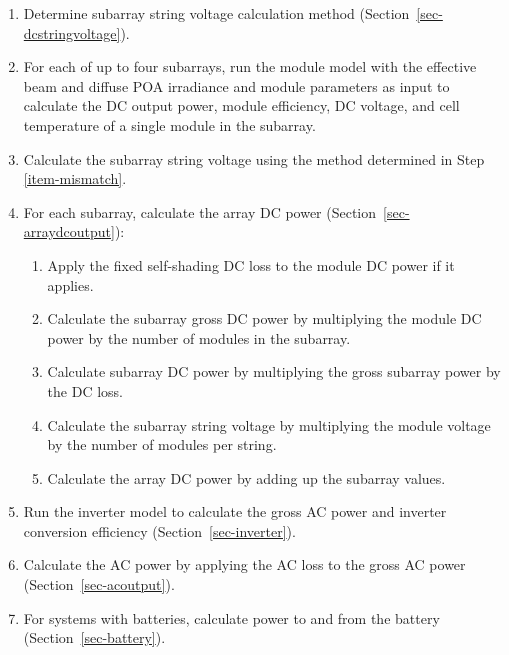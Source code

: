 \documentclass[12pt,letterpaper]{article}
\begin{document}
\begin{enumerate}
\item{Determine subarray string voltage calculation method (Section~\ref{sec-dcstringvoltage}).} \label{item-mismatch} %

\item{For each of up to four subarrays, run the module model with the effective beam and diffuse POA irradiance and module parameters as input to calculate the DC output power, module efficiency, DC voltage, and cell temperature of a single module in the subarray.} %

\item{Calculate the subarray string voltage using the method determined in Step \ref{item-mismatch}.} %

\item{For each subarray, calculate the array DC power (Section~\ref{sec-arraydcoutput}):} %

  \begin{enumerate}

  \item{Apply the fixed self-shading DC loss to the module DC power if it applies.} %

  \item{Calculate the subarray gross DC power by multiplying the module DC power by the number of modules in the subarray.} %

  \item{Calculate subarray DC power by multiplying the gross subarray power by the DC loss.} %

  \item{Calculate the subarray string voltage by multiplying the module voltage by the number of modules per string.} %

  \item{Calculate the array DC power by adding up the subarray values.}

  \end{enumerate}

\item{Run the inverter model to calculate the gross AC power and inverter conversion efficiency (Section~\ref{sec-inverter}).} %


\item{Calculate the AC power by applying the AC loss to the gross AC power (Section~\ref{sec-acoutput}).} %

\item{For systems with batteries, calculate power to and from the battery (Section~\ref{sec-battery}).}

\end{enumerate}
\end{document}
